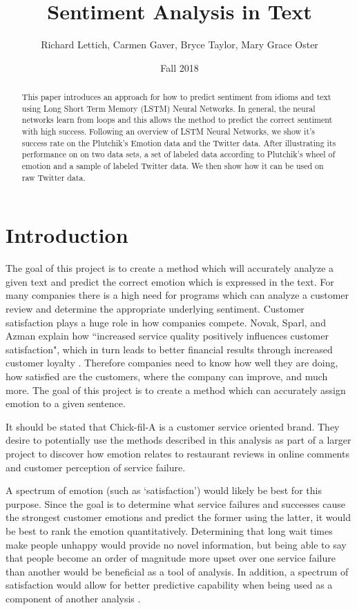 \documentclass[titlepage,letterpaper]{article}
\title{Sentiment Analysis in Text}
\author{Richard Lettich, Carmen Gaver, Bryce Taylor, Mary Grace Oster}
\date{Fall 2018}
\begin{document}
\maketitle

\begin{abstract}
This paper introduces an approach for how to predict sentiment from idioms and text using Long Short Term Memory (LSTM) Neural Networks. In general, the neural networks learn from loops and this allows the method to predict the correct sentiment with high success. Following an overview of LSTM Neural Networks, we show it's success rate on the Plutchik's Emotion data and the Twitter data. After illustrating its performance on on two data sets, a set of labeled data according to Plutchik's wheel of emotion and a sample of labeled Twitter data. We then show how it can be used on raw Twitter data. \\
\end{abstract}

\section{Introduction}

The goal of this project is to create a method which will accurately analyze a given text and predict the correct emotion which is expressed in the text. For many companies there is a high need for programs which can analyze a customer review and determine the appropriate underlying sentiment. Customer satisfaction plays a huge role in how companies compete. Novak, Sparl, and Azman explain how ``increased service quality positively influences customer satisfaction", which in turn leads to better financial results through increased customer loyalty \cite{BusinessCustomerSatisfaction}. Therefore companies need to know how well they are doing, how satisfied are the customers, where the company can improve, and much more. The goal of this project is to create a method which can accurately assign emotion to a given sentence.

It should be stated that Chick-fil-A is a customer service oriented brand. They desire to potentially use the methods described in this analysis as part of a larger project to discover how emotion relates to restaurant reviews in online comments and customer perception of service failure.

A spectrum of emotion (such as `satisfaction') would likely be best for this purpose. Since the goal is to determine what service failures and successes cause the strongest customer emotions and predict the former using the latter, it would be best to rank the emotion quantitatively. Determining that long wait times make people unhappy would provide no novel information, but being able to say that people become an order of magnitude more upset over one service failure than another would be beneficial as a tool of analysis. In addition, a spectrum of satisfaction would allow for better predictive capability when being used as a component of another analysis \cite{lowriwilliams}.
\end{document}
